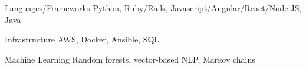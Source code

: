

\begin{cvskills}
  \cvskill
    {Languages/Frameworks}
    {Python, Ruby/Rails, Javascript/Angular/React/Node.JS, Java}

  \cvskill
    {Infrastructure}
    {AWS, Docker, Ansible, SQL}

  \cvskill
    {Machine Learning}
    {Random forests, vector-based NLP, Markov chains}

\end{cvskills}

